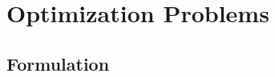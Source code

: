 \documentclass{beamer}
\begin{document}


















\section{Optimization Problems}










\subsection{Formulation}
\end{document}
